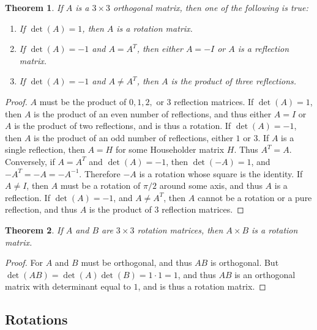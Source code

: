 \documentclass[oneside]{book}
\newtheorem{theorem}{Theorem}[section]
\theoremstyle{definition}
\begin{document}
\begin{theorem}
If $A$ is a $3\times 3$ orthogonal matrix, then one of the following is true:
\begin{enumerate}
\item If $\det(A) = 1$, then $A$ is a rotation matrix.
\item If $\det(A) = -1$ and $A=A^T$, then either $A=-I$ or $A$ is a reflection matrix.
\item If $\det(A) = -1$ and $A\ne A^T$, then $A$ is the product of three reflections.
\end{enumerate}
\end{theorem}
\begin{proof}
$A$ must be the product of $0,1,2,$ or $3$ reflection matrices. If $\det(A) = 1$, then $A$ is the product of an even number of reflections, and thus either $A=I$ or $A$ is the product of two reflections, and is thus a rotation. If $\det(A)=-1$, then $A$ is the product of an odd number of reflections, either $1$ or $3$. If $A$ is a single reflection, then $A=H$ for some Householder matrix $H$. Thus $A^T = A$. Conversely, if $A = A^T$ and $\det(A) = -1$, then $\det(-A) = 1$, and $-A^T = -A = -A^{-1}$. Therefore $-A$ is a rotation whose square is the identity. If $A\ne I$, then $A$ must be a rotation of $\pi/2$ around some axis, and thus $A$ is a reflection. If $\det(A) = -1$, and $A\ne A^T$, then $A$ cannot be a rotation or a pure reflection, and thus $A$ is the product of $3$ reflection matrices.
\end{proof}

\begin{theorem}
If $A$ and $B$ are $3\times 3$ rotation matrices, then $A\times B$ is a rotation matrix.
\end{theorem}
\begin{proof}
For $A$ and $B$ must be orthogonal, and thus $AB$ is orthogonal. But $\det(AB) = \det(A)\det(B) = 1\cdot 1 = 1$, and thus $AB$ is an orthogonal matrix with determinant equal to $1$, and is thus a rotation matrix.
\end{proof}

\subsection{Rotations}
\end{document}
